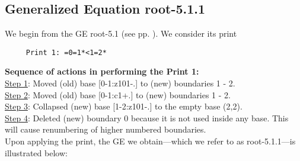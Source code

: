 \documentclass[final]{article}
\begin{document}
\subsection*{Generalized Equation root-5.1.1}
\label{root-5.1.1}We begin from the GE root-5.1 (see pp. \pageref{root-5.1}).  {We consider its print}
\begin{verbatim}
     Print 1: =0=1*<1=2*
\end{verbatim}
{\bf Sequence of actions in performing the Print 1:}\\
{\underline{Step 1}:} Moved (old) base [0-1:z101-.]  to (new) boundaries 1 - 2.\\
{\underline{Step 2}:} Moved (old) base [0-1:c1+.]  to (new) boundaries 1 - 2.\\
{\underline{Step 3}:} Collapsed (new) base [1-2:z101-.]  to the empty base (2,2).
\\
{\underline{Step 4}:} Deleted (new) boundary 0 because it is not used inside any base.  This will cause renumbering of higher numbered boundaries.
\\[0.1in]
{Upon applying the print, the GE we obtain---which we refer to as root-5.1.1---is illustrated below:}
\end{document}
